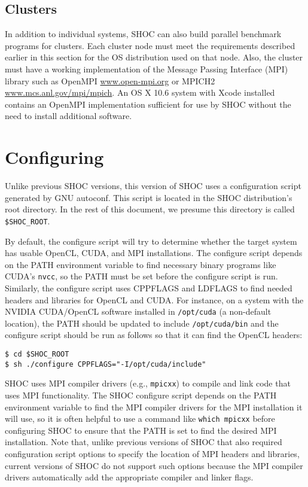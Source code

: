 \documentclass[11pt]{article}
\begin{document}
\subsection{Clusters}
In addition to individual systems, SHOC can also build parallel benchmark
programs for clusters. Each cluster node must meet the requirements described
earlier in this section for the OS distribution used on that node.
Also, the cluster must have a working implementation of the 
Message Passing Interface 
(MPI)\,\cite{gropp-lusk-skjellum:using-mpi2nd,gropp-lusk-thakur:usingmpi2}
library such as OpenMPI \url{www.open-mpi.org} or MPICH2 
\url{www.mcs.anl.gov/mpi/mpich}.
An OS X 10.6 system with Xcode installed contains an OpenMPI implementation
sufficient for use by SHOC without the need to install additional software.


\section{Configuring}\label{sec:configuring}

Unlike previous SHOC versions, this version of SHOC uses a configuration script
generated by GNU autoconf.  
This script is located in the SHOC distribution's root directory.
In the rest of this document, we presume this directory is called 
\verb+$SHOC_ROOT+.

By default, the configure script will try to determine whether the 
target system has usable OpenCL, CUDA, and MPI installations.  
The configure script depends on the PATH environment variable to find necessary
binary programs like CUDA's \verb+nvcc+, so the PATH must be set before the
configure script is run.
Similarly, the configure script uses CPPFLAGS and LDFLAGS to find needed
headers and libraries for OpenCL and CUDA.
For instance, on a system with the NVIDIA CUDA/OpenCL software installed
in \verb+/opt/cuda+ (a non-default location), the PATH should be updated to include
\verb+/opt/cuda/bin+ and the configure script should be run as follows so that it can
find the OpenCL headers:

\begin{Verbatim}[frame=single]
$ cd $SHOC_ROOT
$ sh ./configure CPPFLAGS="-I/opt/cuda/include"
\end{Verbatim}

SHOC uses MPI compiler drivers (e.g., \verb+mpicxx+) to compile and link code
that uses MPI functionality.
The SHOC configure script depends on the PATH environment variable to find
the MPI compiler drivers for the MPI installation it will use, so it is often
helpful to use a command like \verb+which mpicxx+ before configuring SHOC
to ensure that the PATH is set to find the desired MPI installation.
Note that, unlike previous versions of SHOC that also required configuration
script options to specify the location of MPI headers and libraries, current
versions of SHOC do not support such options because the MPI compiler drivers
automatically add the appropriate compiler and linker flags.
\end{document}
